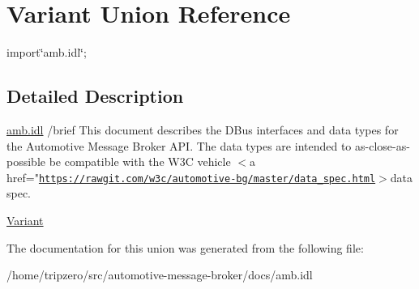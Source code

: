 \hypertarget{unionVariant}{\section{Variant Union Reference}
\label{unionVariant}
}


{\ttfamily import\char`\"{}amb.\-idl\char`\"{};}



\subsection{Detailed Description}
\hyperlink{amb_8idl_source}{amb.\-idl} /brief This document describes the D\-Bus interfaces and data types for the Automotive Message Broker A\-P\-I. The data types are intended to as-\/close-\/as-\/ possible be compatible with the W3\-C vehicle $<$a href="\href{https://rawgit.com/w3c/automotive-bg/master/data_spec.html}{\tt https\-://rawgit.\-com/w3c/automotive-\/bg/master/data\-\_\-spec.\-html}$>$data spec.

\hyperlink{unionVariant}{Variant} 

The documentation for this union was generated from the following file\-:\begin{DoxyCompactItemize}
\item 
/home/tripzero/src/automotive-\/message-\/broker/docs/amb.\-idl\end{DoxyCompactItemize}
